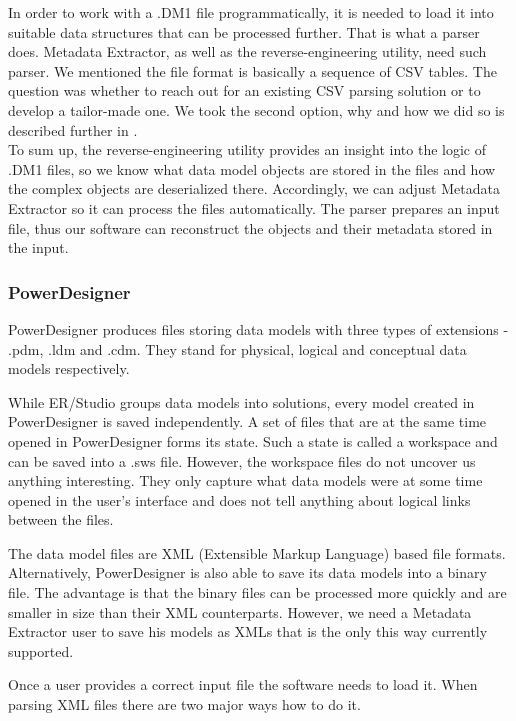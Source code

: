 In order to work with a .DM1 file programmatically, it is needed to load it into suitable data structures that can be processed further. That is what a parser does. 
Metadata Extractor, as well as the reverse-engineering utility,  need such parser.
We mentioned the file format is basically a sequence of CSV tables. 
The question was whether to reach out for an existing CSV parsing solution or to develop a tailor-made one.
We took the second option, why and how we did so is described further in . \\

To sum up, the reverse-engineering utility provides an insight into the logic of .DM1 files, so we  know what data model objects are stored in the files and how the complex objects are deserialized there. Accordingly, we can adjust Metadata Extractor so it can process the files automatically. The parser prepares an input file, thus our software can reconstruct the objects and their metadata stored in the input.

\subsubsection{PowerDesigner}

PowerDesigner produces files storing data models with three types of extensions - .pdm, .ldm and .cdm.
They stand for physical, logical and conceptual data models respectively.

While ER/Studio groups data models into solutions, every model created in PowerDesigner is saved independently. 
A set of files that are at the same time opened in PowerDesigner forms its state. 
Such a state is called a workspace and can be saved into a .sws file. However, the workspace files do not uncover us anything interesting. 
They only capture what data models were at some time opened in the user's interface and does not tell anything about logical links between the files.

The data model files are XML (Extensible Markup Language) based file formats.
Alternatively, PowerDesigner is also able to save its data models into a binary file. The advantage is that the binary files can be processed more quickly and are smaller in size than their XML counterparts. 
However, we need a Metadata Extractor user to save his models as XMLs that is the only this way currently supported.

Once a user provides a correct input file the software needs to load it. When parsing XML files there are two major ways how to do it. \\

